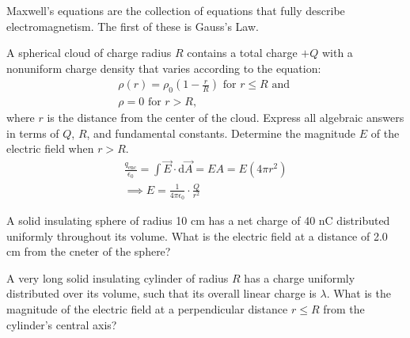 \documentclass[../em.tex]{subfiles}
\begin{document}
Maxwell's equations are the collection of equations that fully describe electromagnetism. The first of these is Gauss's Law.
\begin{example}
    A spherical cloud of charge radius $R$ contains a total charge $+Q$ with a 
    nonuniform charge density that varies according to the equation:
    \begin{align*}
        \rho(r)=\rho_0\left(1-\frac{r}{R}\right) \text{ for } r\leq R \text{ and }\\
        \rho = 0 \text{ for } r>R\text{,}
    \end{align*}
    where $r$ is the distance from the center of the cloud. Express all algebraic answers in terms of $Q$, $R$, and fundamental constants. Determine the magnitude $E$ of the electric field when $r>R$.
    \begin{align*}
        \frac{q_\text{enc}}{\epsilon_0}=\int\vec{E}\cdot\mathrm{d}\vec{A}=EA=E(4\pi r^2)
        \\
        \implies E=\frac{1}{4\pi\epsilon_0}\cdot\frac{Q}{r^2}
    \end{align*}
\end{example}
\ex A solid insulating sphere of radius 10 cm has a net charge of 40 nC distributed uniformly throughout its volume. What is the electric field at a distance of 2.0 cm from the cneter of the sphere?

\ex A very long solid insulating cylinder of radius $R$ has a charge uniformly distributed over its volume, such that its overall linear charge is $\lambda$. What is the magnitude of the electric field at a perpendicular distance $r\leq R$ from the cylinder's central axis?
\end{document}

